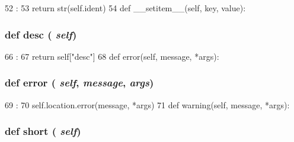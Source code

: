 \begin{DoxyCode}
52                      :
53         return str(self.ident)
54 
    def __setitem__(self, key, value):
\end{DoxyCode}
\hypertarget{classslicc_1_1symbols_1_1Symbol_1_1Symbol_a0a4b6f74007ab2b4de7aae39102732ea}{
\subsubsection[{desc}]{\setlength{\rightskip}{0pt plus 5cm}def desc ( {\em self})}}
\label{classslicc_1_1symbols_1_1Symbol_1_1Symbol_a0a4b6f74007ab2b4de7aae39102732ea}



\begin{DoxyCode}
66                   :
67         return self["desc"]
68 
    def error(self, message, *args):
\end{DoxyCode}
\hypertarget{classslicc_1_1symbols_1_1Symbol_1_1Symbol_a3133d4a0dde10b6ebe257e3db716a3e0}{
\subsubsection[{error}]{\setlength{\rightskip}{0pt plus 5cm}def error ( {\em self}, \/   {\em message}, \/   {\em args})}}
\label{classslicc_1_1symbols_1_1Symbol_1_1Symbol_a3133d4a0dde10b6ebe257e3db716a3e0}



\begin{DoxyCode}
69                                    :
70         self.location.error(message, *args)
71 
    def warning(self, message, *args):
\end{DoxyCode}
\hypertarget{classslicc_1_1symbols_1_1Symbol_1_1Symbol_a7c1284bafc28442baf652148e07f9ecd}{
\subsubsection[{short}]{\setlength{\rightskip}{0pt plus 5cm}def short ( {\em self})}}
\label{classslicc_1_1symbols_1_1Symbol_1_1Symbol_a7c1284bafc28442baf652148e07f9ecd}



